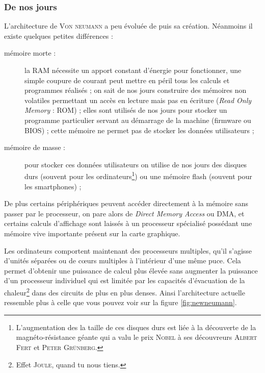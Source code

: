 \subsubsection{De nos jours}
L'architecture de \textsc{Von neumann} a peu évoluée de puis sa création. Néanmoins il existe quelques petites différences :
\begin{description}
\item[mémoire morte : ] la RAM nécessite un apport constant d'énergie pour fonctionner, une simple coupure de courant peut mettre en péril tous les calculs et programmes réalisés ; on sait de nos jours construire des mémoires non volatiles permettant un accès en lecture mais pas en écriture (\emph{Read Only Memory} : ROM) ; elles sont utilisés de nos jours pour stocker un programme particulier servant au démarrage de la machine (firmware ou BIOS) ; cette mémoire ne permet pas de stocker les données utilisateurs ;
\item[mémoire de masse :] pour stocker ces données utilisateurs on utilise de nos jours des disques durs (souvent pour les ordinateurs\footnote{L'augmentation des la taille de ces disques durs est liée à la découverte de la magnéto-résistance géante qui a valu le prix \textsc{Nobel} à ses découvreurs \textsc{Albert Fert} et \textsc{Peter Grünberg}.}) ou une mémoire flash (souvent pour les smartphones) ;
\end{description}
De plus certains périphériques peuvent accéder directement à la mémoire sans passer par le processeur, on pare alors de \emph{Direct Memory Access} ou DMA, et certains calculs d'affichage sont laissés à un processeur spécialisé possédant une mémoire vive importante présent sur la carte graphique.\par
Les ordinateurs comportent maintenant des processeurs multiples, qu'il s'agisse d'unités séparées ou de \og cœurs \fg multiples à l'intérieur d'une même puce. Cela permet d'obtenir une puissance de calcul plus élevée sans augmenter la puissance d'un processeur individuel qui est limitée par les capacités d'évacuation de la chaleur\footnote{Effet \textsc{Joule}, quand tu nous tiens.} dans des circuits de plus en plus denses. Ainsi l'architecture actuelle ressemble plus à celle que vous pouvez voir sur la figure \ref{fig:newneumann}.
